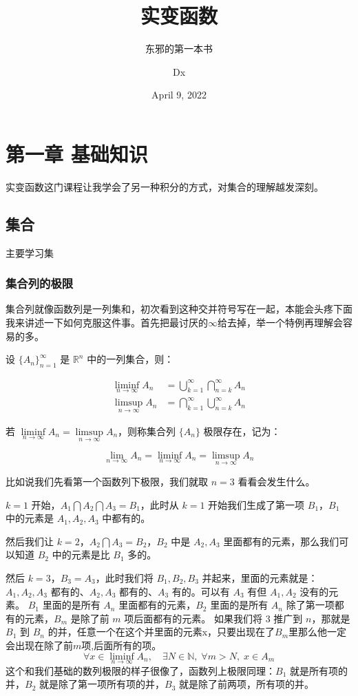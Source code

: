 \documentclass[lang=cn,10pt]{elegantbook}
\title{实变函数}
\subtitle{东邪的第一本书}
\author{Dx}
\institute{Elegant\LaTeX{} Program}
\date{April 9, 2022}
\let\oldliminf\liminf
\renewcommand{\liminf}{\mathop{\oldliminf}\limits}
\let\oldlimsup\limsup
\renewcommand{\limsup}{\mathop{\oldlimsup}\limits}
\begin{document}
\maketitle
\frontmatter

\tableofcontents

\mainmatter

\chapter{第一章 基础知识}
实变函数这门课程让我学会了另一种积分的方式，对集合的理解越发深刻。



  
\section{集合}

主要学习集

\subsection{集合列的极限}
集合列就像函数列是一列集和，初次看到这种交并符号写在一起，本能会头疼下面我来讲述一下如何克服这件事。首先把最讨厌的$\infty$给去掉，举一个特例再理解会容易的多。
\begin{definition}
    设 $\{A_n\}_{n=1}^\infty$ 是 $\mathbb{R}^n$ 中的一列集合，则：

\begin{align*}
\liminf_{n \to \infty} A_n &= \bigcup_{k=1}^\infty \bigcap_{n = k}^\infty A_n \\[1em]
\limsup_{n \to \infty} A_n &= \bigcap_{k=1}^\infty \bigcup_{n = k}^\infty A_n
\end{align*}

若 $\liminf_{n \to \infty} A_n = \limsup_{n \to \infty} A_n$，则称集合列 $\{A_n\}$ 极限存在，记为：

\[
\lim_{n \to \infty} A_n = \liminf_{n \to \infty} A_n = \limsup_{n \to \infty} A_n
\]
\end{definition}
比如说我们先看第一个函数列下极限，我们就取 $n=3$ 看看会发生什么。

$k=1$ 开始，$A_1 \bigcap A_2 \bigcap A_3 = B_1$，此时从 $k=1$ 开始我们生成了第一项 $B_1$，$B_1$ 中的元素是 $A_1,A_2,A_3$ 中都有的。

然后我们让 $k=2$，$A_2 \bigcap A_3 = B_2$，$B_2$ 中是 $A_2,A_3$ 里面都有的元素，那么我们可以知道 $B_2$ 中的元素是比 $B_1$ 多的。

然后 $k=3$，$B_3 = A_3$，此时我们将 $B_1,B_2,B_3$ 并起来，里面的元素就是：$A_1,A_2,A_3$ 都有的、$A_2,A_3$ 都有的、$A_3$ 有的。可以有 $A_3$ 有但 $A_1,A_2$ 没有的元素。
$B_1$ 里面的是所有 $A_n$ 里面都有的元素，$B_2$ 里面的是所有 $A_n$ 除了第一项都有的元素，$B_m$ 是除了前 $m$ 项后面都有的元素。
如果我们将 $3$ 推广到 $n$，那就是 $B_1$ 到 $B_n$ 的并，任意一个在这个并里面的元素x，只要出现在了$B_m$里那么他一定会出现在除了前$m$项,后面所有的项。
\[
\forall x \in \liminf_{n \to \infty} A_n, \quad \exists N \in \mathbb{N}, \; \forall m > N, \; x \in A_m
\] 
这个和我们基础的数列极限的样子很像了，函数列上极限同理：$B_1$ 就是所有项的并，$B_2$ 就是除了第一项所有项的并，$B_3$ 就是除了前两项，所有项的并。
\end{document}
